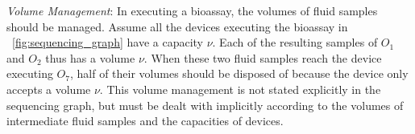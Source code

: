 \textit{Volume Management}: In executing a bioassay, 
the volumes of fluid samples should be managed.
Assume all the devices executing the bioassay in
\figname~\ref{fig:sequencing_graph}
have a capacity $\nu$. Each of the resulting samples of $O_1$ and $O_2$ thus has a
volume $\nu$. When these two fluid samples reach the device executing
$O_7$, half of their volumes should be disposed of because the device only 
accepts a volume $\nu$.
This volume management is not stated explicitly in the sequencing graph, but 
must be dealt with implicitly according to the volumes of intermediate fluid 
samples and the capacities of devices.    


